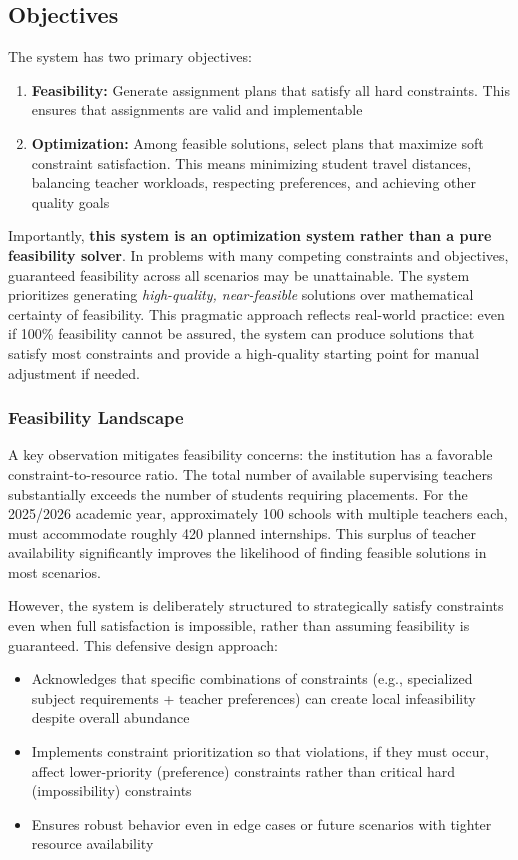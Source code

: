 \documentclass[12pt,a4paper]{report}
\begin{document}
\subsection{Objectives}

The system has two primary objectives:

\begin{enumerate}
    \item \textbf{Feasibility:} Generate assignment plans that satisfy all hard constraints. This ensures that assignments are valid and implementable
    
    \item \textbf{Optimization:} Among feasible solutions, select plans that maximize soft constraint satisfaction. This means minimizing student travel distances, balancing teacher workloads, respecting preferences, and achieving other quality goals
\end{enumerate}

Importantly, \textbf{this system is an optimization system rather than a pure feasibility solver}. In problems with many competing constraints and objectives, guaranteed feasibility across all scenarios may be unattainable. The system prioritizes generating \textit{high-quality, near-feasible} solutions over mathematical certainty of feasibility. This pragmatic approach reflects real-world practice: even if 100\% feasibility cannot be assured, the system can produce solutions that satisfy most constraints and provide a high-quality starting point for manual adjustment if needed.

\subsubsection*{Feasibility Landscape}

A key observation mitigates feasibility concerns: the institution has a favorable constraint-to-resource ratio. The total number of available supervising teachers substantially exceeds the number of students requiring placements. For the 2025/2026 academic year, approximately 100 schools with multiple teachers each, must accommodate roughly 420 planned internships. This surplus of teacher availability significantly improves the likelihood of finding feasible solutions in most scenarios.

However, the system is deliberately structured to strategically satisfy constraints even when full satisfaction is impossible, rather than assuming feasibility is guaranteed. This defensive design approach:
\begin{itemize}
    \item Acknowledges that specific combinations of constraints (e.g., specialized subject requirements + teacher preferences) can create local infeasibility despite overall abundance
    \item Implements constraint prioritization so that violations, if they must occur, affect lower-priority (preference) constraints rather than critical hard (impossibility) constraints
    \item Ensures robust behavior even in edge cases or future scenarios with tighter resource availability
\end{itemize}
\end{document}
